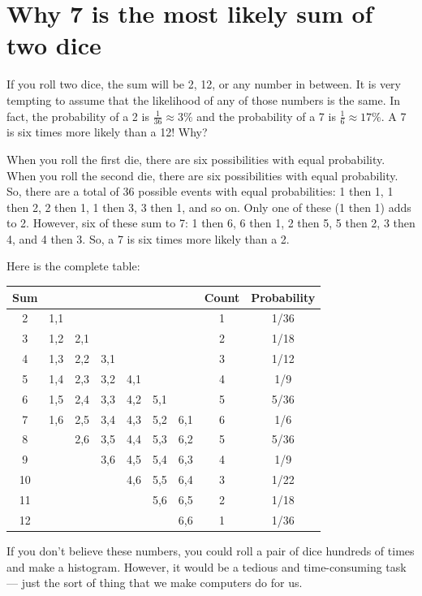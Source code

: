 \section{Why 7 is the most likely sum of two dice}

If you roll two dice, the sum will be 2, 12, or any number in
between. It is very tempting to assume that the likelihood of any of
those numbers is the same. In fact, the probability of a 2 is
$\frac{1}{36} \approx 3\%$ and the probability of a 7 is $\frac{1}{6}
\approx 17\%$. A 7 is six times more likely than a 12! Why?

When you roll the first die, there are six possibilities with equal
probability. When you roll the second die, there are six possibilities
with equal probability. So, there are a total of 36 possible events
with equal probabilities: 1 then 1, 1 then 2, 2 then 1, 1 then 3, 3
then 1, and so on. Only one of these (1 then 1) adds to 2. However, six of these
sum to 7: 1 then 6, 6 then 1, 2 then 5, 5 then 2, 3 then 4, and 4 then
3. So, a 7 is six times more likely than a 2.

Here is the complete table:
\begin{tabular}{c| c c c c c c | c | c}
  Sum &     &     &     &     &     &     & Count & Probability \\
  \hline
  2   & 1,1 &     &     &     &     &     &   1    & 1/36 \\
  3   & 1,2 & 2,1 &     &     &     &     &   2    & 1/18 \\
  4   & 1,3 & 2,2 & 3,1 &     &     &     &   3    & 1/12 \\
  5   & 1,4 & 2,3 & 3,2 & 4,1 &     &     &   4    & 1/9 \\
  6   & 1,5 & 2,4 & 3,3 & 4,2 & 5,1 &     &   5    & 5/36 \\
  7   & 1,6 & 2,5 & 3,4 & 4,3 & 5,2 & 6,1 &   6    & 1/6 \\
  8   &     & 2,6 & 3,5 & 4,4 & 5,3 & 6,2 &   5    & 5/36 \\
  9   &     &     & 3,6 & 4,5 & 5,4 & 6,3 &   4    & 1/9 \\
  10  &     &     &     & 4,6 & 5,5 & 6,4 &   3    & 1/22 \\
  11  &     &     &     &     & 5,6 & 6,5 &   2    & 1/18 \\
  12  &     &     &     &     &     & 6,6 &   1    & 1/36
\end{tabular}

If you don't believe these numbers, you could
roll a pair of dice hundreds of times and make a histogram. However, it would be a
tedious and time-consuming task --- just the sort of thing that we make
computers do for us.

